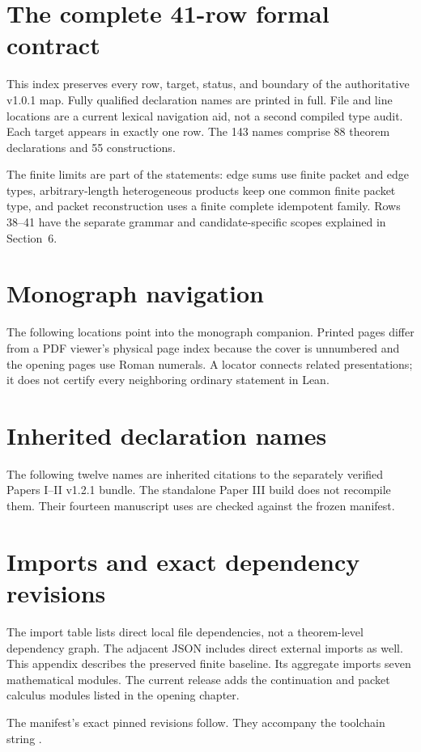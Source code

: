 \tableofcontents
\clearpage
{}

\clearpage







\clearpage
\section{The complete 41-row formal contract}\label{sec:map}
This index preserves every row, target, status, and boundary of the authoritative v1.0.1 map. Fully qualified declaration names are printed in full. File and line locations are a current lexical navigation aid, not a second compiled type audit. Each target appears in exactly one row. The 143 names comprise 88 theorem declarations and 55 constructions.

The finite limits are part of the statements: edge sums use finite packet and edge types, arbitrary-length heterogeneous products keep one common finite packet type, and packet reconstruction uses a finite complete idempotent family. Rows 38--41 have the separate grammar and candidate-specific scopes explained in Section~6.

\clearpage
\appendix
\section{Monograph navigation}\label{app:crosswalk}
The following locations point into the monograph companion. Printed pages differ from a PDF viewer's physical page index because the cover is unnumbered and the opening pages use Roman numerals. A locator connects related presentations; it does not certify every neighboring ordinary statement in Lean.

\section{Inherited declaration names}\label{app:inherited}
The following twelve names are inherited citations to the separately verified Papers I--II v1.2.1 bundle. The standalone Paper III build does not recompile them. Their fourteen manuscript uses are checked against the frozen manifest.

\clearpage
\section{Imports and exact dependency revisions}
The import table lists direct local file dependencies, not a theorem-level dependency graph. The adjacent JSON includes direct external imports as well. This appendix describes the preserved finite baseline. Its aggregate imports seven mathematical modules. The current release adds the continuation and packet calculus modules listed in the opening chapter.

The manifest's exact pinned revisions follow. They accompany the toolchain string .

\clearpage
